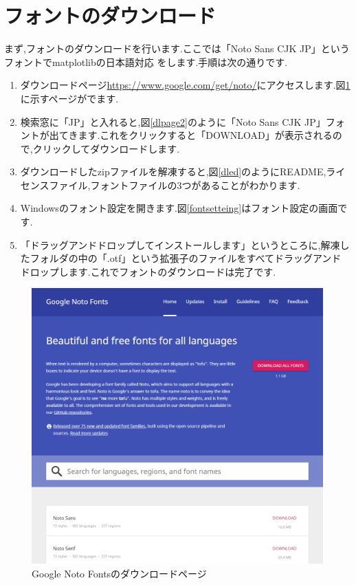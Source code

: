 \documentclass[a4j]{jarticle}
\begin{document}
      \section{フォントのダウンロード}
      まず,フォントのダウンロードを行います.ここでは「Noto Sans CJK JP」というフォントでmatplotlibの日本語対応
      をします.手順は次の通りです.
      \begin{enumerate}
        \item ダウンロードページ\url{https://www.google.com/get/noto/}にアクセスします.図\ref{dlpage1}に示すページがでます.
        \item 検索窓に「JP」と入れると,図\ref{dlpage2}のように「Noto Sans CJK JP」フォントが出てきます.これをクリックすると「DOWNLOAD」が表示されるので,クリックしてダウンロードします.
        \item ダウンロードしたzipファイルを解凍すると,図\ref{dled}のようにREADME,ライセンスファイル,フォントファイルの3つがあることがわかります.
        \item Windowsのフォント設定を開きます.図\ref{fontsetteing}はフォント設定の画面です.
        \item 「ドラッグアンドドロップしてインストールします」というところに,解凍したフォルダの中の「.otf」という拡張子のファイルをすべてドラッグアンドドロップします.これでフォントのダウンロードは完了です.
        \end{enumerate}

        \begin{figure}[H]
          \centering
          \includegraphics[scale=0.3]{downloadpage.png}
          \caption{Google Noto Fontsのダウンロードページ}
           \label{dlpage1}
          \end{figure}
\end{document}
